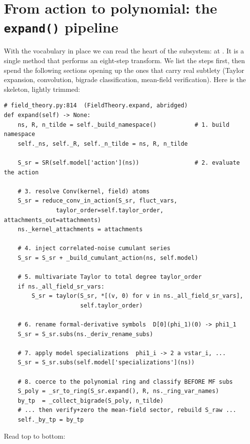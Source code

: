 \section{From action to polynomial: the \texttt{expand()} pipeline}

With the vocabulary in place we can read the heart of the subsystem:
 at . It is a single method
that performs an eight-step transform. We list the steps first, then spend the
following sections opening up the ones that carry real subtlety (Taylor expansion,
convolution, bigrade classification, mean-field verification). Here is the
skeleton, lightly trimmed:

\begin{lstlisting}
# field_theory.py:814  (FieldTheory.expand, abridged)
def expand(self) -> None:
    ns, R, n_tilde = self._build_namespace()           # 1. build namespace
    self._ns, self._R, self._n_tilde = ns, R, n_tilde

    S_sr = SR(self.model['action'](ns))                # 2. evaluate the action

    # 3. resolve Conv(kernel, field) atoms
    S_sr = reduce_conv_in_action(S_sr, fluct_vars,
               taylor_order=self.taylor_order, attachments_out=attachments)
    ns._kernel_attachments = attachments

    # 4. inject correlated-noise cumulant series
    S_sr = S_sr + _build_cumulant_action(ns, self.model)

    # 5. multivariate Taylor to total degree taylor_order
    if ns._all_field_sr_vars:
        S_sr = taylor(S_sr, *[(v, 0) for v in ns._all_field_sr_vars],
                      self.taylor_order)

    # 6. rename formal-derivative symbols  D[0](phi_1)(0) -> phi1_1
    S_sr = S_sr.subs(ns._deriv_rename_subs)

    # 7. apply model specializations  phi1_i -> 2 a vstar_i, ...
    S_sr = S_sr.subs(self.model['specializations'](ns))

    # 8. coerce to the polynomial ring and classify BEFORE MF subs
    S_poly = _sr_to_ring(S_sr.expand(), R, ns._ring_var_names)
    by_tp  = _collect_bigrade(S_poly, n_tilde)
    # ... then verify+zero the mean-field sector, rebuild S_raw ...
    self._by_tp = by_tp
\end{lstlisting}

Read top to bottom:


